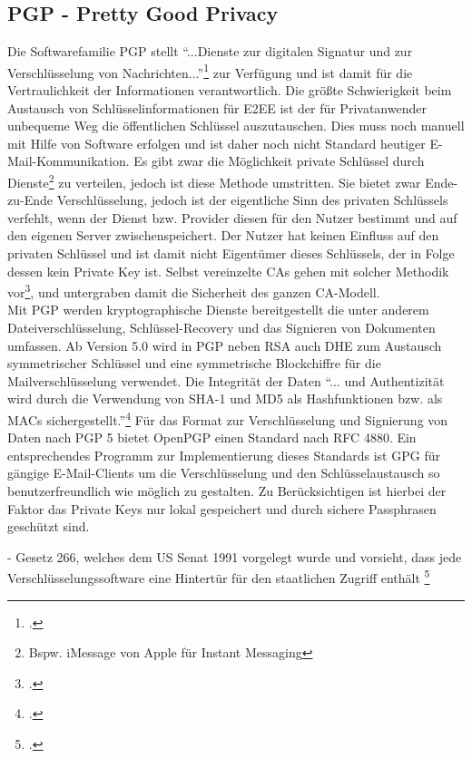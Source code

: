 \documentclass  [paper=a4,
				fontsize=12pt,
				listof=totoc,
				bibliography=totoc
				]{scrreprt}
\begin{document}
			\subsection{PGP - Pretty Good Privacy}
			\label{subsec:pgp}
				Die Softwarefamilie \acl{PGP} stellt ``...Dienste zur digitalen Signatur und zur Verschlüsselung von Nachrichten...''\footcite{Mueller2011} zur Verfügung und ist damit für die Vertraulichkeit der Informationen verantwortlich.
				Die größte Schwierigkeit beim Austausch von Schlüsselinformationen für \ac{E2EE} ist der für Privatanwender unbequeme Weg die öffentlichen Schlüssel auszutauschen. Dies muss noch manuell mit Hilfe von Software erfolgen und ist daher noch nicht Standard heutiger E-Mail-Kommunikation. 
				Es gibt zwar die Möglichkeit private Schlüssel durch Dienste\footnote{Bspw. iMessage von Apple für Instant Messaging} zu verteilen, jedoch ist diese Methode umstritten. Sie bietet zwar Ende-zu-Ende Verschlüsselung, jedoch ist der eigentliche Sinn des privaten Schlüssels verfehlt, wenn der Dienst bzw. Provider diesen für den Nutzer bestimmt und auf den eigenen Server zwischenspeichert. Der Nutzer hat keinen Einfluss auf den privaten Schlüssel und ist damit nicht Eigentümer dieses Schlüssels, der in Folge dessen kein Private Key ist. 
				Selbst vereinzelte \ac{CA}s gehen mit solcher Methodik vor\footcite{Kaps2014}, und untergraben damit die Sicherheit des ganzen \ac{CA}-Modell. \medskip\\
				Mit PGP werden kryptographische Dienste bereitgestellt die unter anderem Dateiverschlüsselung, Schlüssel-Recovery und das Signieren von Dokumenten umfassen.
				Ab Version 5.0 wird in PGP neben \ac{RSA} auch \ac{DHE} zum Austausch symmetrischer Schlüssel und eine symmetrische Blockchiffre für die Mailverschlüsselung verwendet. Die Integrität der Daten ``... und Authentizität wird durch die Verwendung von \ac{SHA}-1 und \ac{MD5} als Hashfunktionen bzw. als \ac{MAC}s sichergestellt.''\footcite[][S.823]{Eckert2013}\medskip
				Für das Format zur Verschlüsselung und Signierung von Daten nach \ac{PGP} 5 bietet OpenPGP einen Standard nach \acs{RFC} 4880. Ein entsprechendes Programm zur Implementierung dieses Standards ist \ac{GPG} für gängige E-Mail-Clients um die Verschlüsselung und den Schlüsselaustausch so benutzerfreundlich wie möglich zu gestalten. Zu Berücksichtigen ist hierbei der Faktor das Private Keys nur lokal gespeichert und durch sichere Passphrasen geschützt sind.
				
				
				- Gesetz 266, welches dem US Senat 1991 vorgelegt wurde und vorsieht, dass jede Verschlüsselungssoftware eine Hintertür für den staatlichen Zugriff enthält
				\footcite[][S. 29]{Schwenk}
				
\end{document}
